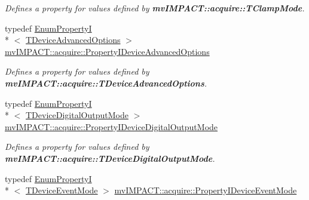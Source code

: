 \begin{DoxyCompactItemize}
\begin{DoxyCompactList}\small\item\em Defines a property for values defined by {\bfseries mv\+I\+M\+P\+A\+C\+T\+::acquire\+::\+T\+Clamp\+Mode}. \end{DoxyCompactList}\item 
\hypertarget{group___device_specific_interface_ga100e69ae1a36b64b3abed0337f42628a}{typedef \hyperlink{classmv_i_m_p_a_c_t_1_1acquire_1_1_enum_property_i}{Enum\+Property\+I}\\*
$<$ \hyperlink{group___device_specific_interface_gad8cdd91ea42682e1055b0fb168f2ea58}{T\+Device\+Advanced\+Options} $>$ \hyperlink{group___device_specific_interface_ga100e69ae1a36b64b3abed0337f42628a}{mv\+I\+M\+P\+A\+C\+T\+::acquire\+::\+Property\+I\+Device\+Advanced\+Options}}\label{group___device_specific_interface_ga100e69ae1a36b64b3abed0337f42628a}

\begin{DoxyCompactList}\small\item\em Defines a property for values defined by {\bfseries mv\+I\+M\+P\+A\+C\+T\+::acquire\+::\+T\+Device\+Advanced\+Options}. \end{DoxyCompactList}\item 
\hypertarget{group___device_specific_interface_ga5f000e26caff489ab90bc45f1adb64ea}{typedef \hyperlink{classmv_i_m_p_a_c_t_1_1acquire_1_1_enum_property_i}{Enum\+Property\+I}\\*
$<$ \hyperlink{group___device_specific_interface_gad65061e17a93ca4a79e5b75d8ca78a27}{T\+Device\+Digital\+Output\+Mode} $>$ \hyperlink{group___device_specific_interface_ga5f000e26caff489ab90bc45f1adb64ea}{mv\+I\+M\+P\+A\+C\+T\+::acquire\+::\+Property\+I\+Device\+Digital\+Output\+Mode}}\label{group___device_specific_interface_ga5f000e26caff489ab90bc45f1adb64ea}

\begin{DoxyCompactList}\small\item\em Defines a property for values defined by {\bfseries mv\+I\+M\+P\+A\+C\+T\+::acquire\+::\+T\+Device\+Digital\+Output\+Mode}. \end{DoxyCompactList}\item 
\hypertarget{group___device_specific_interface_ga703f3c4af8606165b832097144354c75}{typedef \hyperlink{classmv_i_m_p_a_c_t_1_1acquire_1_1_enum_property_i}{Enum\+Property\+I}\\*
$<$ \hyperlink{group___common_interface_gaaf184a07cd31343a6b831f41ee7038b4}{T\+Device\+Event\+Mode} $>$ \hyperlink{group___device_specific_interface_ga703f3c4af8606165b832097144354c75}{mv\+I\+M\+P\+A\+C\+T\+::acquire\+::\+Property\+I\+Device\+Event\+Mode}}\label{group___device_specific_interface_ga703f3c4af8606165b832097144354c75}


\end{DoxyCompactItemize}

